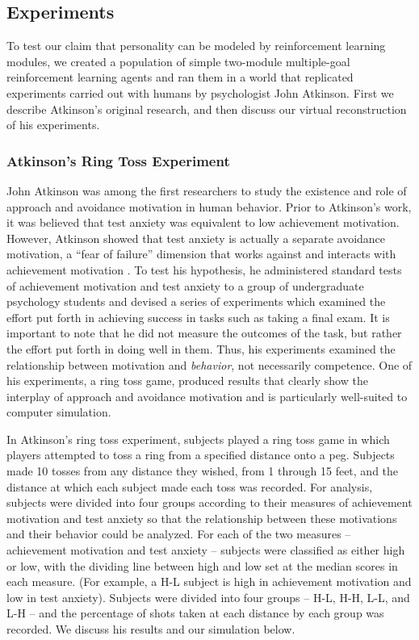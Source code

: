 \subsection{Experiments}

To test our claim that personality can be modeled by reinforcement learning modules, we created a population of simple two-module multiple-goal reinforcement learning agents and ran them in a world that replicated experiments carried out with humans by psychologist John Atkinson.  First we describe Atkinson's original research, and then discuss our virtual reconstruction of his experiments.

\subsubsection{Atkinson's Ring Toss Experiment}\label{sec:ring-toss}

John Atkinson was among the first researchers to study the existence and role of approach and avoidance motivation in human behavior. Prior to Atkinson's work, it was believed that test anxiety was equivalent to low achievement motivation.  However, Atkinson showed that test anxiety is actually a separate avoidance motivation, a ``fear of failure'' dimension that works against and interacts with achievement motivation \cite{atkinson1960achievement}.  To test his hypothesis, he administered standard tests of achievement motivation and test anxiety to a group of undergraduate psychology students and devised a series of experiments which examined the effort put forth in achieving success in tasks such as taking a final exam.  It is important to note that he did not measure the outcomes of the task, but rather the effort put forth in doing well in them.  Thus, his experiments examined the relationship between motivation and {\em behavior}, not necessarily competence.  One of his experiments, a ring toss game, produced results that clearly show the interplay of approach and avoidance motivation and is particularly well-suited to computer simulation.

In Atkinson's ring toss experiment, subjects played a ring toss game in which players attempted to toss a ring from a specified distance onto a peg.  Subjects made 10 tosses from any distance they wished, from 1 through 15 feet, and the distance at which each subject made each toss was recorded.  For analysis, subjects were divided into four groups according to their measures of achievement motivation and test anxiety so that the relationship between these motivations and their behavior could be analyzed.  For each of the two measures -- achievement motivation and test anxiety -- subjects were classified as either high or low, with the dividing line between high and low set at the median scores in each measure.  (For example, a H-L subject is high in achievement motivation and low in test anxiety).  Subjects were divided into four groups -- H-L, H-H, L-L, and L-H -- and the percentage of shots taken at each distance by each group was recorded. We discuss his results and our simulation below.

